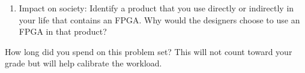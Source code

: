 \documentclass{../../e85}
\begin{document}
\begin{enumerate}
  Design a \(16\)-input lowest priority circuit with a propagation
  delay not exceeding \SI{55}{\ps}.  Suppose each \(2\)-input gate has
  a delay of \SI{10}{\ps} and an inverter has a delay of \SI{5}{\ps}.
  Sketch a schematic for your circuit.  If you are spending too much
  time on this problem, you may relax the delay requirement to
  \SI{180}{\ps} for partial credit.  How would you design it?  Then,
  increase the input size and look for any pattern.

  \begin{solution}
  \end{solution}

\item Impact on society: Identify a product that you use directly or
  indirectly in your life that contains an FPGA.  Why would the
  designers choose to use an FPGA in that product?

  \begin{solution}
  \end{solution}
\end{enumerate}

How long did you spend on this problem set?  This will not count
toward your grade but will help calibrate the workload.
\begin{solution}
\end{solution}
\end{document}
